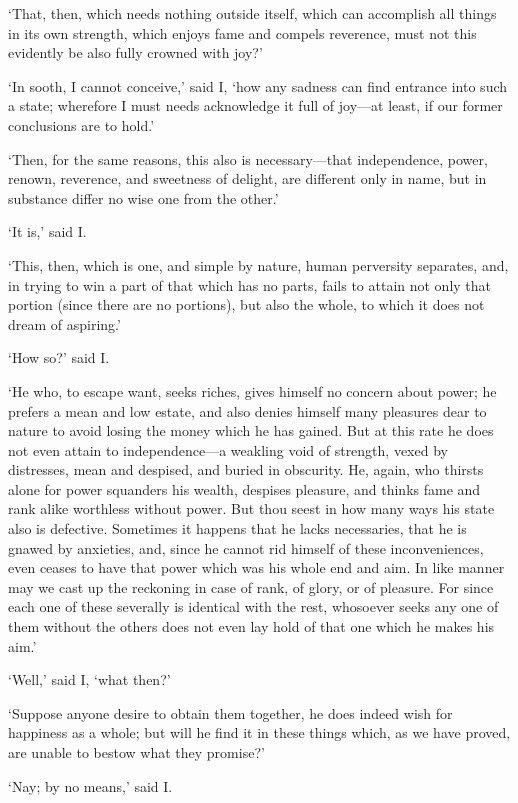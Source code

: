 \documentclass[11pt]{book}
\begin{document}
`That, then, which needs nothing outside itself, which can accomplish
all things in its own strength, which enjoys fame and compels reverence,
must not this evidently be also fully crowned with joy?'

`In sooth, I cannot conceive,' said I, `how any sadness can find
entrance into such a state; wherefore I must needs acknowledge it full
of joy---at least, if our former conclusions are to hold.'

`Then, for the same reasons, this also is necessary---that independence,
power, renown, reverence, and sweetness of delight, are different only
in name, but in substance differ no wise one from the other.'

`It is,' said I.

`This, then, which is one, and simple by nature, human perversity
separates, and, in trying to win a part of that which has no parts,
fails to attain not only that portion (since there are no portions), but
also the whole, to which it does not dream of aspiring.'

`How so?' said I.

`He who, to escape want, seeks riches, gives himself no concern about
power; he prefers a mean and low estate, and also denies himself many
pleasures dear to nature to avoid losing the money which he has gained.
But at this rate he does not even attain to independence---a weakling
void of strength, vexed by distresses, mean and despised, and buried in
obscurity. He, again, who thirsts alone for power squanders his wealth,
despises pleasure, and thinks fame and rank alike worthless without
power. But thou seest in how many ways his state also is defective.
Sometimes it happens that he lacks necessaries, that he is gnawed by
anxieties, and, since he cannot rid himself of these inconveniences,
even \linebreak ceases to have that power which was his whole end and aim. In like
manner may we cast up the reckoning in case of rank, of glory, or of
pleasure. For since each one of these severally is identical with the
rest, whosoever seeks any one of them without the others does not even
lay hold of that one which he makes his aim.'

`Well,' said I, `what then?'

`Suppose anyone desire to obtain them together, he does indeed wish for
happiness as a whole; but will he find it in these things which, as we
have proved, are unable to bestow what they promise?'

`Nay; by no means,' said I.
\end{document}
